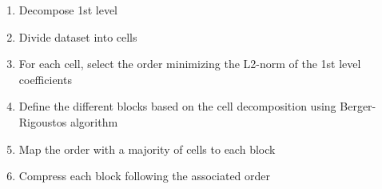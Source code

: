 \documentclass[conference]{IEEEtran}
\theoremstyle{remark}
\begin{document}
\begin{enumerate}
\item Decompose 1st level
\item Divide dataset into cells
\item For each cell, select the order minimizing the L2-norm of the 1st level coefficients
\item Define the different blocks based on the cell decomposition using Berger-Rigoustos algorithm
\item Map the order with a majority of cells to each block
\item Compress each block following the associated order
\end{enumerate}

\end{document}
